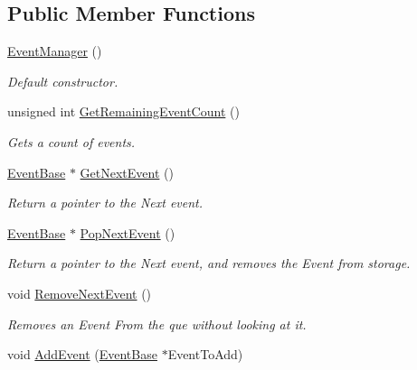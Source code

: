 \subsection*{Public Member Functions}
\begin{DoxyCompactItemize}
\item 
\hyperlink{classphys_1_1EventManager_a018b36588bf2a2e90536e64be060d6fc}{EventManager} ()
\begin{DoxyCompactList}\small\item\em Default constructor. \item\end{DoxyCompactList}\item 
unsigned int \hyperlink{classphys_1_1EventManager_a67b755e3fe888e1305312d0f966f4a06}{GetRemainingEventCount} ()
\begin{DoxyCompactList}\small\item\em Gets a count of events. \item\end{DoxyCompactList}\item 
\hyperlink{classphys_1_1EventBase}{EventBase} $\ast$ \hyperlink{classphys_1_1EventManager_aa0937763961aefc59aea197a8f9bc0dc}{GetNextEvent} ()
\begin{DoxyCompactList}\small\item\em Return a pointer to the Next event. \item\end{DoxyCompactList}\item 
\hyperlink{classphys_1_1EventBase}{EventBase} $\ast$ \hyperlink{classphys_1_1EventManager_ae403b203bc425744377ec5fc311f4e5d}{PopNextEvent} ()
\begin{DoxyCompactList}\small\item\em Return a pointer to the Next event, and removes the Event from storage. \item\end{DoxyCompactList}\item 
void \hyperlink{classphys_1_1EventManager_a2389a44d199f121e1fea741f83248513}{RemoveNextEvent} ()
\begin{DoxyCompactList}\small\item\em Removes an Event From the que without looking at it. \item\end{DoxyCompactList}\item 
void \hyperlink{classphys_1_1EventManager_abada23d83ef38e59a38eb91a88a07404}{AddEvent} (\hyperlink{classphys_1_1EventBase}{EventBase} $\ast$EventToAdd)

\end{DoxyCompactItemize}
